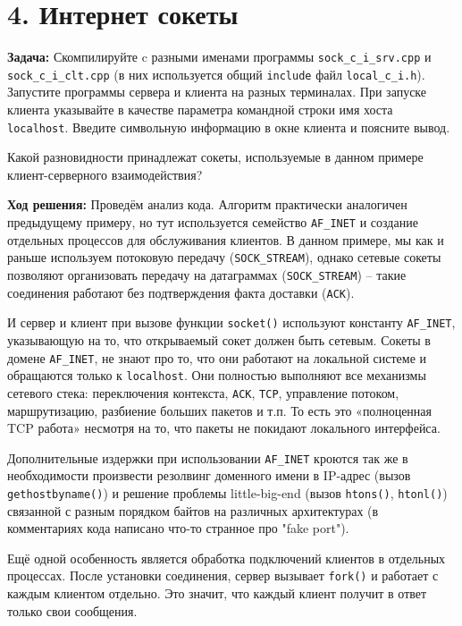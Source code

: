 \section*{4. Интернет сокеты}
\textbf{Задача:} Скомпилируйте c разными именами программы \texttt{sock\_c\_i\_srv.cpp} и \texttt{sock\_c\_i\_clt.cpp} (в них используется общий \texttt{include} файл \texttt{local\_c\_i.h}). Запустите программы сервера и клиента на разных терминалах. При запуске клиента указывайте в качестве параметра командной строки имя хоста \texttt{localhost}. Введите символьную информацию в окне клиента и поясните вывод.

Какой разновидности принадлежат сокеты, используемые в данном примере клиент-серверного взаимодействия?

\textbf{Ход решения:} Проведём анализ кода. Алгоритм практически аналогичен предыдущему примеру, но тут используется семейство \texttt{AF\_INET} и создание отдельных процессов для обслуживания клиентов. В данном примере, мы как и раньше используем потоковую передачу (\texttt{SOCK\_STREAM}), однако сетевые сокеты позволяют организовать передачу на датаграммах (\texttt{SOCK\_STREAM}) -- такие соединения работают без подтверждения факта доставки (\texttt{ACK}).

И сервер и клиент при вызове функции \texttt{socket()} используют константу \texttt{AF\_INET}, указывающую на то, что открываемый сокет должен быть сетевым. Сокеты в домене \texttt{AF\_INET}, не знают про то, что они работают на локальной системе и обращаются только к \texttt{localhost}. Они полностью выполняют все механизмы сетевого стека: переключения контекста, \texttt{ACK}, \texttt{TCP}, управление потоком, маршрутизацию, разбиение больших пакетов и т.п. То есть это «полноценная TCP работа» несмотря на то, что пакеты не покидают локального интерфейса.

Дополнительные издержки при использовании \texttt{AF\_INET} кроются так же в необходимости произвести резолвинг доменного имени в IP-адрес (вызов \texttt{gethostbyname()}) и решение проблемы little-big-end (вызов \texttt{htons()}, \texttt{htonl()}) связанной с разным порядком байтов на различных архитектурах (в комментариях кода написано что-то странное про "fake port").

Ещё одной особенность является обработка подключений клиентов в отдельных процессах. После установки соединения, сервер вызывает \texttt{fork()} и работает с каждым клиентом отдельно. Это значит, что каждый клиент получит в ответ только свои сообщения.

